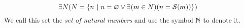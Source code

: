 \begin{axiom}[Infinity]
    \vspace{-\abovedisplayskip}
    \[
        \exists N \pn*{N = \set*{n \suchthat n = \emptyset \join \exists\pn*{m \in N}\pn*{n = \successor{m}}}}
    \]
    We call this set the \emph{set of natural numbers} and use the symbol \(\mathbb{N}\) to denote it.
\end{axiom}

\begin{theorem}
\end{theorem}


